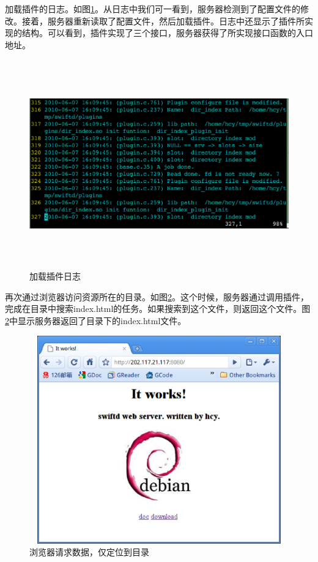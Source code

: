 \documentclass[twoside, xetex]{report}
\begin{document}
	加载插件的日志。如图\ref{loadpluginlog}。从日志中我们可一看到，服务器检测到了配置文件的修改。接着，服务器重新读取了配置文件，然后加载插件。日志中还显示了插件所实现的结构。可以看到，插件实现了三个接口，服务器获得了所实现接口函数的入口地址。
	
	\begin{figure}[htbp]
	\centering
	\includegraphics[height=9cm, width=15cm]{pics/loadpluginlog.eps}
	\caption{加载插件日志}
	\label{loadpluginlog}
	\end{figure}
	

	再次通过浏览器访问资源所在的目录。如图\ref{access2}。这个时候，服务器通过调用插件，完成在目录中搜索index.html的任务。如果搜索到这个文件，则返回这个文件。图\ref{access2}中显示服务器返回了目录下的index.html文件。
	\begin{figure}[htbp]
	\centering
	\includegraphics[height=9cm, width=12cm]{pics/access2.eps}
	\caption{浏览器请求数据，仅定位到目录}
	\label{access2}
	\end{figure}
	
\end{document}
